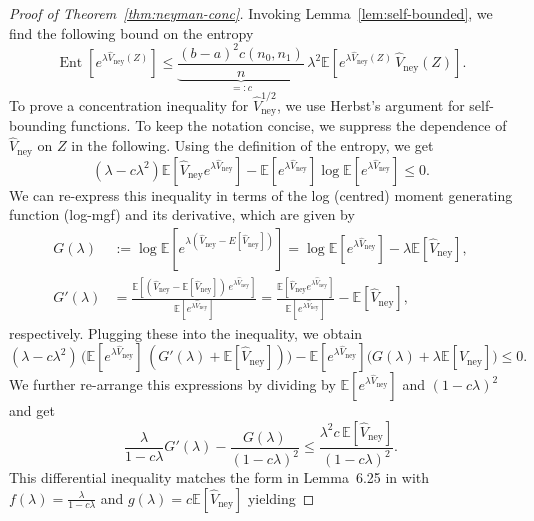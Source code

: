 \documentclass[aos]{imsart2}
\theoremstyle{plain}
\theoremstyle{definition}
\newcommand{\E}{\mathbb{E}}
\newcommand{\vhn}{\hat{V}_{\mathrm{ney}}}
\DeclareMathOperator{\ent}{Ent}
\begin{document}
\begin{appendix}
\begin{proof}[Proof of Theorem~\ref{thm:neyman-conc}]
    Invoking Lemma~\ref{lem:self-bounded}, we find the following bound on the entropy
    \begin{equation*}
        \ent[e^{\lambda \vhn(Z)}] \leq \underbrace{\frac{(b-a)^2 c(n_0,n_1)}{n}}_{=:c}\,\lambda^2\E\left[e^{\lambda \vhn(Z)}\, \vhn(Z)\right].
    \end{equation*}
    To prove a concentration inequality for $\vhn^{1/2}$, we use Herbst's argument for self-bounding functions. %
    To keep the notation concise, we suppress the dependence of $\vhn$ on $Z$ in the following. Using the definition of the entropy, we get
    \begin{equation*}
        (\lambda-c\lambda^2) \E[\vhn e^{\lambda \vhn}] - \E[e^{\lambda \vhn}]\log\E[e^{\lambda \vhn}] \leq 0.
    \end{equation*}
    We can re-express this inequality in terms of the log (centred) moment generating function (log-mgf) and its derivative, which are given by
    \begin{align*}
        G(\lambda) &:= \log \E[e^{\lambda(\vhn-E[\vhn])}] = \log\E[e^{\lambda \vhn}]-\lambda\E[\vhn],\\
        G'(\lambda) &= \frac{\E\left[(\vhn-\E[\vhn])\, e^{\lambda \vhn}\right]}{\E\left[e^{\lambda \vhn}\right]} = \frac{\E[\vhn e^{\lambda \vhn}]}{\E[e^{\lambda \vhn}]}-\E[\vhn],
    \end{align*}
    respectively. Plugging these into the inequality, we obtain
    \begin{equation*}
        (\lambda-c\lambda^2)\, \Big(\E[e^{\lambda \vhn}]\,(G'(\lambda)+\E[\vhn])\Big) - \E[e^{\lambda \vhn}] \Big(G(\lambda) + \lambda \E[\vhn]\Big) \leq 0.
    \end{equation*}
    We further re-arrange this expressions by dividing by $\E[e^{\lambda \vhn}]$ and $(1- c\lambda)^2$ and get
    \begin{equation*}
        \frac{\lambda}{1-c\lambda}G'(\lambda) - \frac{G(\lambda)}{(1-c\lambda)^2} \leq \frac{\lambda^2c\,\E[\vhn]}{(1-c\lambda)^2}.
    \end{equation*}
    This differential inequality matches the form in Lemma~6.25 in \cite{boucheron_concentration_2013} with $f(\lambda) = \frac{\lambda}{1-c\lambda}$ and $g(\lambda) = c\E[\vhn]$ yielding

\end{proof}
\end{appendix}
\end{document}
